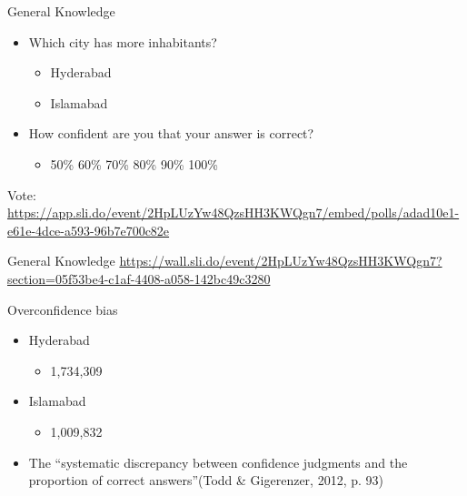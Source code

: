 \documentclass[
  ignorenonframetext,
]{beamer}
\providecommand{\tightlist}{%
  \setlength{\itemsep}{0pt}\setlength{\parskip}{0pt}}\usepackage{longtable,booktabs,array}
\begin{document}
\begin{frame}{General Knowledge}
\protect\hypertarget{general-knowledge}{}
\begin{itemize}
\tightlist
\item
  Which city has more inhabitants?

  \begin{itemize}
  \tightlist
  \item
    Hyderabad
  \item
    Islamabad
  \end{itemize}
\item
  How confident are you that your answer is correct?

  \begin{itemize}
  \tightlist
  \item
    50\% 60\% 70\% 80\% 90\% 100\%
  \end{itemize}
\end{itemize}

Vote:
\url{https://app.sli.do/event/2HpLUzYw48QzsHH3KWQgn7/embed/polls/adad10e1-e61e-4dce-a593-96b7e700c82e}
\end{frame}

\begin{frame}{General Knowledge}
\protect\hypertarget{general-knowledge-1}{}
\url{https://wall.sli.do/event/2HpLUzYw48QzsHH3KWQgn7?section=05f53be4-c1af-4408-a058-142bc49c3280}
\end{frame}

\begin{frame}{Overconfidence bias}
\protect\hypertarget{overconfidence-bias}{}
\begin{itemize}
\tightlist
\item
  Hyderabad

  \begin{itemize}
  \tightlist
  \item
    1,734,309
  \end{itemize}
\item
  Islamabad

  \begin{itemize}
  \tightlist
  \item
    1,009,832
  \end{itemize}
\item
  The ``systematic discrepancy between confidence judgments and the
  proportion of correct answers''(Todd \& Gigerenzer, 2012, p. 93)
\end{itemize}
\end{frame}
\end{document}
